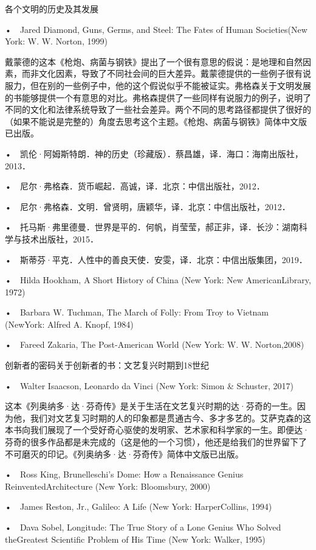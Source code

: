 各个文明的历史及其发展

•　Jared Diamond, Guns, Germs, and Steel: The Fates of Human Societies(New York: W. W. Norton, 1999)

戴蒙德的这本《枪炮、病菌与钢铁》提出了一个很有意思的假说：是地理和自然因素，而非文化因素，导致了不同社会间的巨大差异。戴蒙德提供的一些例子很有说服力，但在别的一些例子中，他的这个假说似乎不能被证实。弗格森关于文明发展的书能够提供一个有意思的对比。弗格森提供了一些同样有说服力的例子，说明了不同的文化和法律系统导致了一些社会差异。两个不同的思考路径都提供了很好的（如果不能说是完整的）角度去思考这个主题。《枪炮、病菌与钢铁》简体中文版已出版。

•　凯伦·阿姆斯特朗．神的历史（珍藏版）．蔡昌雄，译．海口：海南出版社，2013．

•　尼尔·弗格森．货币崛起．高诚，译．北京：中信出版社，2012．

•　尼尔·弗格森．文明．曾贤明，唐颖华，译．北京：中信出版社，2012．

•　托马斯·弗里德曼．世界是平的．何帆，肖莹莹，郝正非，译．长沙：湖南科学与技术出版社，2015．


•　斯蒂芬·平克．人性中的善良天使．安雯，译．北京：中信出版集团，2019．

•　Hilda Hookham, A Short History of China (New York: New AmericanLibrary, 1972)

•　Barbara W. Tuchman, The March of Folly: From Troy to Vietnam (NewYork: Alfred A. Knopf, 1984)

•　Fareed Zakaria, The Post-American World (New York: W. W. Norton,2008)


创新者的密码关于创新者的书：文艺复兴时期到18世纪

•　Walter Isaacson, Leonardo da Vinci (New York: Simon \& Schuster, 2017)

这本《列奥纳多·达·芬奇传》是关于生活在文艺复兴时期的达·芬奇的一生。因为他，我们对文艺复习时期的人的印象都是贯通古今、多才多艺的。艾萨克森的这本书向我们展现了一个受好奇心驱使的发明家、艺术家和科学家的一生。即便达·芬奇的很多作品都是未完成的（这是他的一个习惯），他还是给我们的世界留下了不可磨灭的印记。《列奥纳多·达·芬奇传》简体中文版已出版。

•　Ross King, Brunelleschi’s Dome: How a Renaissance Genius ReinventedArchitecture (New York: Bloomsbury, 2000)

•　James Reston, Jr., Galileo: A Life (New York: HarperCollins, 1994)

•　Dava Sobel, Longitude: The True Story of a Lone Genius Who Solved theGreatest Scientific Problem of His Time (New York: Walker, 1995)



